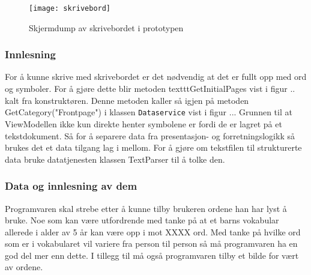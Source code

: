 {\begin{figure}[ht!] 
\centering 
\texttt{[image: skrivebord]} 
\caption{Skjermdump av skrivebordet i prototypen} 
\label{fig:skrivebord} 
\end{figure} 
 

\subsubsection{Innlesning}


For å kunne skrive med skrivebordet er det nødvendig at det er fullt opp med ord og symboler. For å gjøre dette blir metoden texttt{GetInitialPages} vist i figur .. kalt fra konstruktøren. Denne metoden kaller så igjen på metoden GetCategory("Frontpage") i klassen \texttt{Dataservice} vist i figur ... Grunnen til at ViewModellen ikke kun direkte henter symbolene er fordi de er lagret på et tekstdokument. Så for å separere data fra presentasjon- og forretningslogikk så brukes det et data tilgang lag i mellom. For å gjøre om tekstfilen til strukturerte data bruke datatjenesten klassen TextParser til å tolke den. 


\subsubsection{Data og innlesning av dem}

Programvaren skal strebe etter å kunne tilby brukeren ordene han har lyst å bruke. Noe som kan være utfordrende med tanke på at et barns vokabular allerede i alder av 5 år kan være opp i mot XXXX ord. Med tanke på hvilke ord som er i vokabularet vil variere  fra person til person så må programvaren ha en god del mer enn dette. I tillegg til  må også programvaren tilby et bilde for vært av ordene. 

}
